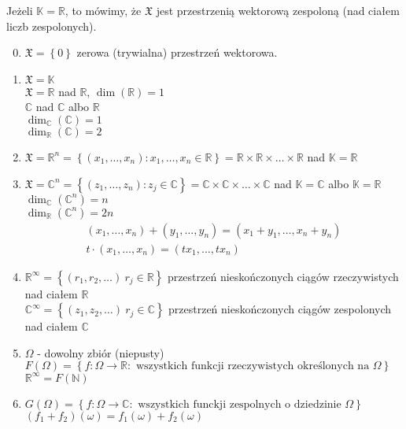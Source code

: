 Jeżeli $ \mathbb K=\mathbb R  $, to mówimy, że $ \mathfrak X $ jest przestrzenią wektorową zespoloną (nad ciałem liczb zespolonych).
\begin{enumerate}[1)]\setcounter{enumi}{-1}
\item $ \mathfrak X =\left\{0\right\}$ zerowa (trywialna) przestrzeń wektorowa.
\item $ \mathfrak X =\mathbb K $\\
$ \mathfrak X =\mathbb R  $ nad $ \mathbb R $, $ \dim(\mathbb R )=1 $\\
$ \mathbb C $ nad $ \mathbb C $ albo $ \mathbb R $\\
$ \dim_\mathbb C(\mathbb C)=1 $\\
$ \dim_\mathbb R(\mathbb C)=2 $
\item $ \mathfrak X =\mathbb R ^n=\left\{\left(x_1,\dots,x_n\right):x_1,\dots,x_n\in \mathbb R \right\}=\mathbb R \times \mathbb R \times\dots\times \mathbb R  $ nad $ \mathbb K=\mathbb R  $
\item $ \mathfrak X =\mathbb C^n=\left\{\left(z_1,\dots,z_n\right):z_j\in\mathbb C\right\}=
\mathbb C\times \mathbb C\times\dots\times\mathbb C $ nad $ \mathbb K=\mathbb C $ albo $ \mathbb K=\mathbb R  $\\
$ \dim_\mathbb C(\mathbb C^n)=n $\\
$ \dim_\mathbb R(\mathbb C^n)=2n $\\
\begin{gather*}
(x_1,\dots,x_n)+(y_1,\dots,y_n)=(x_1+y_1,\dots,x_n+y_n)\\
t\cdot(x_1,\dots,x_n)=(tx_1,\dots,tx_n)
\end{gather*}
\item $ \mathbb R ^\infty =\left\{(r_1,r_2,\dots)\:r_j\in \mathbb R \right\} $ przestrzeń nieskończonych ciągów rzeczywistych nad ciałem $ \mathbb R  $\\
$ \mathbb C ^\infty =\left\{(z_1,z_2,\dots)\:r_j\in \mathbb C \right\} $ przestrzeń nieskończonych ciągów zespolonych nad ciałem $ \mathbb C $
\item $ \Omega $ - dowolny zbiór (niepusty)\\
$ F(\Omega)=\left\{f:\Omega\to \mathbb R :\text{ wszystkich funkcji rzeczywistych określonych na }\Omega\right\} $\\
$ \mathbb R ^\infty =F(\mathbb N ) $
\item $ G(\Omega)=\left\{f:\Omega\to\mathbb C:\text{ wszystkich funckji zespolnych o dziedzinie }\Omega\right\} $\\
$ (f_1+f_2)(\omega)=f_1(\omega)+f_2(\omega) $\\

\end{enumerate}

